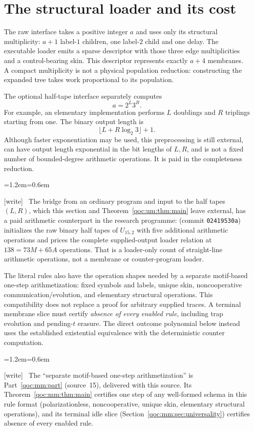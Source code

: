 \documentclass[11pt,letterpaper]{article}
\theoremstyle{definition}
\theoremstyle{remark}
\newcommand{\wtag}{\textup{[write]}}
\newenvironment{writenote}{\par\smallskip\begin{list}{}{\leftmargin=1.2em\rightmargin=0.6em}\item[]\small\wtag\ }{\end{list}\smallskip}
\begin{document}
\section{The structural loader and its cost}\label{qoc:um:sec:loader}
The raw interface takes a positive integer $a$ and uses only its structural multiplicity: $a+1$ label-$1$ children, one label-$2$ child and one delay. The executable loader emits a sparse descriptor with those three edge multiplicities and a control-bearing skin. This descriptor represents exactly $a+4$ membranes. A compact multiplicity is not a physical population reduction: constructing the expanded tree takes work proportional to its population.

The optional half-tape interface separately computes
\[
 a=2^L3^R.
\]
For example, an elementary implementation performs $L$ doublings and $R$ triplings starting from one. The binary output length is
\[
 \lfloor L+R\log_2 3\rfloor+1.
\]
Although faster exponentiation may be used, this preprocessing is still external, can have output length exponential in the bit lengths of $L,R$, and is not a fixed number of bounded-degree arithmetic operations. It is paid in the completeness reduction.

\begin{writenote}
The bridge from an ordinary program and input to the half tapes $(L,R)$, which this section and Theorem~\ref{qoc:um:thm:main} leave external, has a paid arithmetic counterpart in the research programme:  (commit \texttt{02419530a}) initializes the raw binary half tapes of $U_{15,2}$ with five additional arithmetic operations and prices the complete supplied-output loader relation at $138=73M+65A$ operations. That is a loader-only count of straight-line arithmetic operations, not a membrane or counter-program loader.
\end{writenote}


The literal rules also have the operation shapes needed by a separate motif-based one-step arithmetization: fixed symbols and labels, unique skin, noncooperative communication/evolution, and elementary structural operations. This compatibility does not replace a proof for arbitrary supplied traces. A terminal membrane slice must certify \emph{absence of every enabled rule}, including trap evolution and pending-$t$ erasure. The direct outcome polynomial below instead uses the established existential equivalence with the deterministic counter computation.

\begin{writenote}
The ``separate motif-based one-step arithmetization'' is Part~\ref{qoc:mm:part} (source~15), delivered with this source. Its Theorem~\ref{qoc:mm:thm:main} certifies one step of any well-formed schema in this rule format (polarizationless, noncooperative, unique skin, elementary structural operations), and its terminal idle slice (Section~\ref{qoc:mm:sec:universality}) certifies absence of every enabled rule.
\end{writenote}
\end{document}
